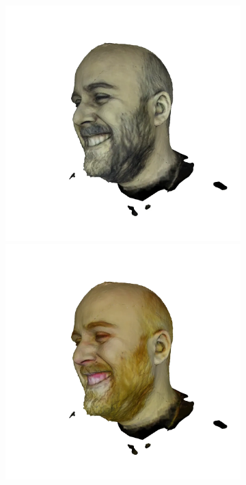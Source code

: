 \begin{figure}
\begin{subfigure}{0.18\linewidth}
        \includegraphics[width=\textwidth]{Figures/failed/stross/3d/snapshot19.png}
        \includegraphics[width=\textwidth]{Figures/failed/stross/3d/snapshot18.png}

\end{subfigure}
\end{figure}
